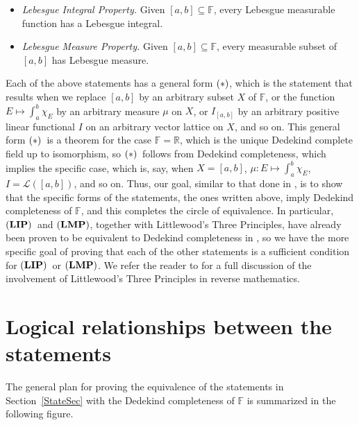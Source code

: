 \documentclass[11pt,a4paper]{article}
\def\Star{\ensuremath{{\bf(*)}}}
\def\iLTP{\ensuremath{{\bf(LP1)}}}
\def\R{\mathbb{R}}
\def\F{\mathbb{F}}
\def\P{\mathbb{P}}
\def\LIP{\ensuremath{{\bf(LIP)}}}
\def\LMP{\ensuremath{{\bf(LMP)}}}
\def\lbrak{\left[}
\def\rbrak{\right]}
\def\abClosed{\lbrak a,b\rbrak}
\def\stepLatt{\mathcal{L}}
\def\elemLatt{\stepLatt(\abClosed)}
\def\elemI{I_{\abClosed}}
\def\sub{\subseteq}
\begin{document}
\begin{itemize}
    \item[\LIP]\emph{Lebesgue Integral Property.} Given $\abClosed\sub\F$, every Lebesgue measurable function has a Lebesgue integral.

        \item[\LMP]\emph{Lebesgue Measure Property.} Given $\abClosed\sub\F$, every  measurable subset of $\abClosed$ has Lebesgue measure.

\end{itemize}

Each of the above statements has a general form \Star, which is the statement that results when we replace $\abClosed$ by an arbitrary subset $X$ of $\F$, or the function $E\mapsto\int_a^b\chi_E$ by an arbitrary measure $\mu$ on $X$, or $\elemI$ by an arbitrary positive linear functional $I$ on an arbitrary vector lattice on $X$, and so on. This general form \Star\  is a theorem for the case $\F=\R$, which is the unique Dedekind complete field up to isomorphism, so \Star\  follows from Dedekind completeness, which implies the specific case, which is, say, when $X=\abClosed$, $\mu:E\mapsto\int_a^b\chi_E$, $I=\elemLatt$, and so on. Thus, our goal, similar to that done in \cite[pp.~116--117]{can24}, is to show that the specific forms of the statements, the ones written above, imply Dedekind completeness of $\F$, and this completes the circle of equivalence. In particular, \LIP\  and \LMP, together with Littlewood's Three Principles, have already been proven to be equivalent to Dedekind completeness in \cite{can24}, so we have the more specific goal of proving that each of the other statements is a sufficient condition for \LIP\  or \LMP. We refer the reader to \cite{can24} for a full discussion of the involvement of Littlewood's Three Principles in reverse mathematics. 

\section{Logical relationships between the statements}

The general plan for proving the equivalence of the statements in Section~\ref{StateSec} with the Dedekind completeness of $\F$ is summarized in the following figure.
\end{document}
